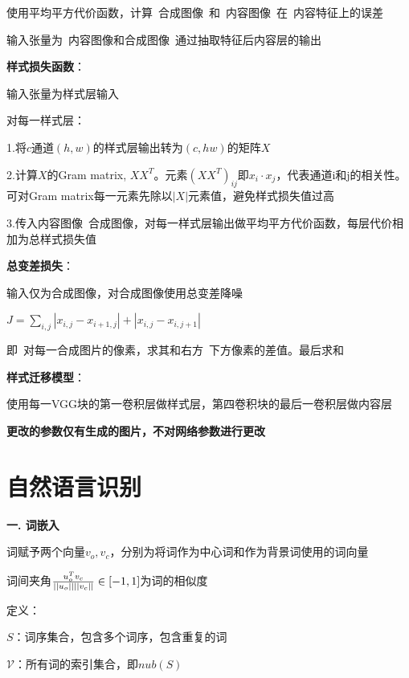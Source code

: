 \documentclass[UTF8]{ctexart}
\begin{document}
  \quad \quad 使用平均平方代价函数，计算\ 合成图像\ 和\ 内容图像\ 在\ 内容特征上的误差

  \quad \quad 输入张量为\ 内容图像和合成图像\ 通过抽取特征后内容层的输出

  \quad \textbf{样式损失函数}：

  \quad \quad 输入张量为样式层输入

  \quad \quad 对每一样式层：

  \quad \quad \quad 1.将$c$通道$(h, w)$的样式层输出转为$(c, hw)$的矩阵$X$

  \quad \quad \quad 2.计算$X$的Gram matrix, $XX^T$。元素$(XX^T)_{ij}$即$x_i \cdot x_j$，代表通道i和j的相关性。可对Gram matrix每一元素先除以$|X|$元素值，避免样式损失值过高

  \quad \quad \quad 3.传入内容图像\ 合成图像，对每一样式层输出做平均平方代价函数，每层代价相加为总样式损失值

  \quad \textbf{总变差损失}：

  \quad \quad 输入仅为合成图像，对合成图像使用总变差降噪

  \quad \quad $J = \sum_{i, j} |x_{i,j} - x_{i+1,j}| + |x_{i,j} - x_{i,j+1}|$

  \quad \quad \quad 即\ 对每一合成图片的像素，求其和右方\ 下方像素的差值。最后求和

  \textbf{样式迁移模型}：

  \quad 使用每一VGG块的第一卷积层做样式层，第四卷积块的最后一卷积层做内容层
  
  \quad \textbf{更改的参数仅有生成的图片，不对网络参数进行更改}

\section{自然语言识别}
\noindent \textbf{一. 词嵌入}

  词赋予两个向量$v_o, v_c$，分别为将词作为中心词和作为背景词使用的词向量
  
  \quad 词间夹角$\frac{u_o^Tv_c}{||u_o||\space||v_c||} \in [-1, 1]$为词的相似度

  定义：

  \quad $S$：词序集合，包含多个词序，包含重复的词

  \quad $\mathcal{V} $：所有词的索引集合，即$nub(S)$
\end{document}
